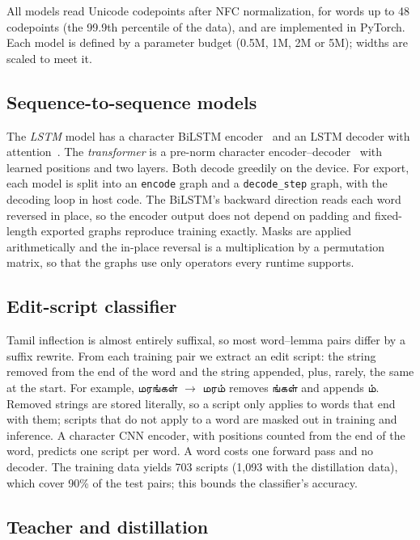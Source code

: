 \documentclass{sadhana}
\newcommand{\ta}[1]{{\tamilfont #1}}
\begin{document}
All models read Unicode codepoints after NFC normalization, for words up to 48
codepoints (the 99.9th percentile of the data), and are implemented in PyTorch.
Each model is defined by a parameter budget (0.5M, 1M, 2M or 5M); widths are
scaled to meet it.

\subsection{Sequence-to-sequence models}

The \emph{LSTM} model has a character BiLSTM encoder~\cite{hochreiter} and an
LSTM decoder with attention~\cite{bahdanau}. The \emph{transformer} is a
pre-norm character encoder--decoder~\cite{vaswani} with learned positions and
two layers. Both decode greedily on the device. For export, each model is split
into an \texttt{encode} graph and a \texttt{decode\_step} graph, with the
decoding loop in host code. The BiLSTM's backward direction reads each word
reversed in place, so the encoder output does not depend on padding and
fixed-length exported graphs reproduce training exactly. Masks are applied
arithmetically and the in-place reversal is a multiplication by a permutation
matrix, so that the graphs use only operators every runtime supports.

\subsection{Edit-script classifier}
\label{sec:edit}

Tamil inflection is almost entirely suffixal, so most word--lemma pairs differ
by a suffix rewrite. From each training pair we extract an edit script: the
string removed from the end of the word and the string appended, plus, rarely,
the same at the start. For example, \ta{மரங்கள்} $\rightarrow$ \ta{மரம்}
removes \ta{ங்கள்} and appends \ta{ம்}. Removed strings are stored literally, so
a script only applies to words that end with them; scripts that do not apply to
a word are masked out in training and inference. A character CNN encoder, with
positions counted from the end of the word, predicts one script per word. A
word costs one forward pass and no decoder. The training data yields 703
scripts (1,093 with the distillation data), which cover 90\% of the test
pairs; this bounds the classifier's accuracy.

\subsection{Teacher and distillation}
\label{sec:kd}
\end{document}
